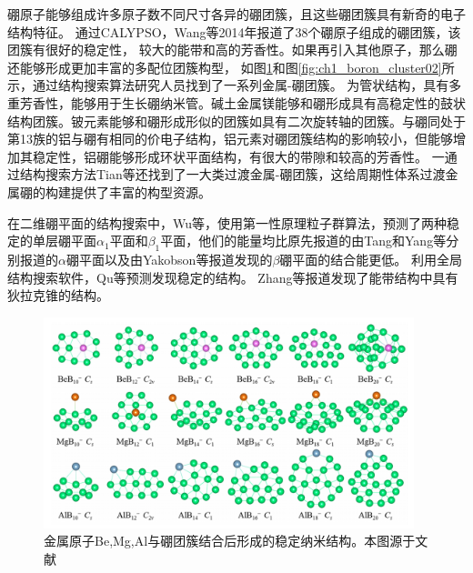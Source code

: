 硼原子能够组成许多原子数不同尺寸各异的硼团簇，且这些硼团簇具有新奇的电子结构特征。
通过CALYPSO，Wang等\cite{lv2014b38}2014年报道了38个硼原子组成的硼团簇，该团簇有很好的稳定性，
较大的能带和高的芳香性。如果再引入其他原子，那么硼还能够形成更加丰富的多配位团簇构型\cite{lv2015stabilization}，
如图\ref{fig:ch1_boron_cluster01}和图\ref{fig:ch1_boron_cluster02}所示，通过结构搜索算法研究人员找到了一系列金属-硼团簇。
\cite{dong2019li}为管状结构，具有多重芳香性，能够用于生长硼纳米管。碱土金属镁能够和硼形成具有高稳定性的鼓状结构团簇\cite{tian2019exhaustive}。铍元素能够和硼形成形似的团簇如具有二次旋转轴的团簇\cite{kang2019probing}。与硼同处于第13族的铝与硼有相同的价电子结构，铝元素对硼团簇结构的影响较小，但能够增加其稳定性，铝硼能够形成环状平面结构\cite{jin2019structural}，有很大的带隙和较高的芳香性。
一通过结构搜索方法Tian等\cite{tian2019cluster}还找到了一大类过渡金属-硼团簇，这给周期性体系过渡金属硼的构建提供了丰富的构型资源。

在二维硼平面的结构搜索中，Wu等\cite{wu2012two}，使用第一性原理粒子群算法，预测了两种稳定的单层硼平面$\alpha_1$平面和$\beta_1$平面，他们的能量均比原先报道的由Tang和Yang等\cite{tang2007novel,yang2008ab}分别报道的$\alpha$硼平面以及由Yakobson等\cite{penev2012polymorphism}报道发现的$\beta$硼平面的结合能更低。
利用全局结构搜索软件，Qu等\cite{qu2017two}预测发现稳定的结构。
Zhang等\cite{zhang2017dirac}报道发现了能带结构中具有狄拉克锥的结构。

\begin{figure}[bt]
  \includegraphics[width=0.96\textwidth]{figs/ch1_boron_cluster01.png}
  \centering
  \caption{金属原子Be,Mg,Al与硼团簇结合后形成的稳定纳米结构。本图源于文献\cite{tian2019cluster}}
  \label{fig:ch1_boron_cluster01}
\end{figure}

